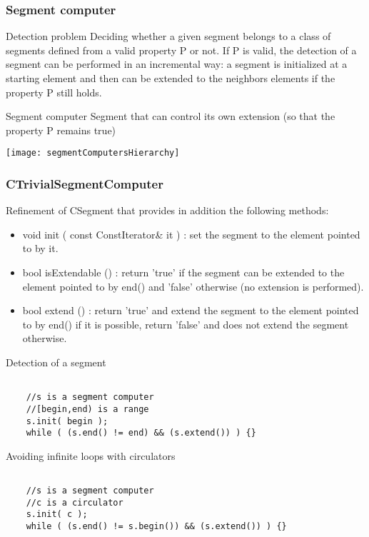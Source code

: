 \begin{frame}
  \frametitle{Segment computer}
 
  \begin{block}{Detection problem}
Deciding whether a given segment belongs to a class of segments defined from a valid property P or not. If P is valid, the detection of a segment can be performed in an incremental way: a segment is initialized at a starting element and then can be extended to the neighbors elements if the property P still holds. 
  \end{block}

  \begin{block}{Segment computer}
Segment that can control its own extension (so that the property P remains true)
  \end{block}

 \begin{center}
   \texttt{[image: segmentComputersHierarchy]}
 \end{center}

\end{frame}

\begin{frame}[fragile]
  \frametitle{CTrivialSegmentComputer}

Refinement of CSegment that provides in addition the following methods:
\begin{itemize}
 \item void init ( const ConstIterator\& it ) : set the segment to the element pointed to by it.
 \item bool isExtendable () : return 'true' if the segment can be extended to the element pointed to by end() and 'false' otherwise (no extension is performed).
 \item bool extend () : return 'true' and extend the segment to the element pointed to by end() if it is possible, return 'false' and does not extend the segment otherwise.
\end{itemize}

  \begin{block}{Detection of a segment}
\begin{verbatim}

    //s is a segment computer
    //[begin,end) is a range
    s.init( begin );
    while ( (s.end() != end) && (s.extend()) ) {} 

\end{verbatim}
  \end{block}

  \begin{block}{Avoiding infinite loops with circulators}
\begin{verbatim}

    //s is a segment computer
    //c is a circulator
    s.init( c );
    while ( (s.end() != s.begin()) && (s.extend()) ) {}

\end{verbatim}
  \end{block}

\end{frame}


